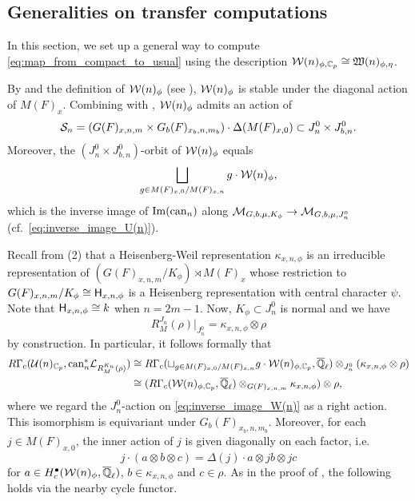 \documentclass[12pt,reqno]{amsart}
\begin{document}
\subsection{Generalities on transfer computations}

In this section, we set up a general way to compute \eqref{eq:map_from_compact_to_usual} using the description ${\mathcal{W}}(n)_{\phi, \mathbb{C}_p} \cong {\mathfrak{W}}(n)_{\phi, \eta}$. 

By  and the definition of ${\mathcal{W}}(n)_\phi$ (see ), ${\mathcal{W}}(n)_\phi$ is stable under the diagonal action of $M(F)_x$. Combining with , ${\mathcal{W}}(n)_\phi$ admits an action of 
\[
    {\mathcal{S}}_n = (G(F)_{x, n, m} \times G_b(F)_{x_b, n, m_b}) \cdot \Delta(M(F)_{x, 0}) \subset J_n^0 \times J_{b, n}^0. 
\]
Moreover, the $(J_n^0 \times J_{b, n}^0)$-orbit of ${\mathcal{W}}(n)_\phi$ equals
\begin{equation} \label{eq:inverse_image_W(n)}
    \bigsqcup_{g \in M(F)_{x, 0} / M(F)_{x, n}} g \cdot {\mathcal{W}}(n)_\phi, 
\end{equation}
which is the inverse image of ${\operatorname{Im}}({\operatorname{can}}_n)$ along ${\mathcal{M}}_{G, b, \mu, K_\phi} \to {\mathcal{M}}_{G, b, \mu, J_n^0}$ (cf.\ \eqref{eq:inverse_image_U(n)}). 

Recall from  (2) that a Heisenberg-Weil representation $\kappa_{x, n, \phi}$ is an irreducible representation of $(G(F)_{x, n, m} / K_\phi) \rtimes M(F)_x$ whose restriction to $G(F)_{x, n, m} / K_\phi \cong {\mathsf{H}}_{x, n, \phi}$ is a Heisenberg representation with central character $\psi$. Note that ${\mathsf{H}}_{x, n, \phi} \cong k$ when $n = 2m - 1$. Now, $K_\phi \subset J_n^0$ is normal and we have 
\[
    R^{J_n}_M(\rho)\vert_{J_n^0} = \kappa_{x, n, \phi} \otimes \rho
\]
by construction. In particular, it follows formally that 
\begin{align*}
    R\Gamma_c({\mathcal{U}}(n)_{\mathbb{C}_p}, {\operatorname{can}}_n^*{\mathcal{L}}_{R^{K_n}_M(\rho)}) &\cong R\Gamma_c(\sqcup_{g \in M(F)_{x, 0} / M(F)_{x, n}} g \cdot {\mathcal{W}}(n)_{\phi, \mathbb{C}_p}, {\overline{\mathbb{Q}}_\ell}) \otimes_{J_n^0} (\kappa_{x, n, \phi} \otimes \rho) \\
    & \cong (R\Gamma_c({\mathcal{W}}(n)_{\phi, \mathbb{C}_p}, {\overline{\mathbb{Q}}_\ell}) \otimes_{G(F)_{x, n, m}} \kappa_{x, n, \phi}) \otimes \rho, 
\end{align*}
where we regard the $J_n^0$-action on \eqref{eq:inverse_image_W(n)} as a right action. This isomorphism is equivariant under $G_b(F)_{x_b, n, m_b}$. Moreover, for each $j \in M(F)_{x, 0}$, the inner action of $j$ is given diagonally on each factor, i.e.\ 
\[
    j \cdot (a \otimes b \otimes c) = \Delta(j)\cdot a \otimes jb \otimes jc
\]
for $a \in H^\bullet_c({\mathcal{W}}(n)_\phi, {\overline{\mathbb{Q}}_\ell})$, $b \in \kappa_{x, n, \phi}$ and $c \in \rho$. As in the proof of , the following holds via the nearby cycle functor. 
\end{document}
